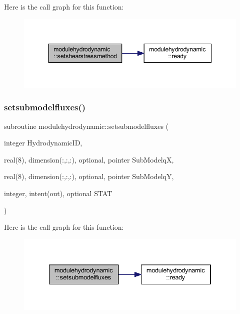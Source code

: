Here is the call graph for this function\+:\nopagebreak
\begin{figure}[H]
\begin{center}
\leavevmode
\includegraphics[width=344pt]{namespacemodulehydrodynamic_abc0b4b19014469e3102675a4dbffe103_cgraph}
\end{center}
\end{figure}
\mbox{\label{namespacemodulehydrodynamic_ab017d9a33e10a535dcc4b545900925de}} 
\subsubsection{\texorpdfstring{setsubmodelfluxes()}{setsubmodelfluxes()}}
{\footnotesize\ttfamily subroutine modulehydrodynamic\+::setsubmodelfluxes (\begin{DoxyParamCaption}\item[{integer}]{Hydrodynamic\+ID,  }\item[{real(8), dimension(\+:,\+:,\+:), optional, pointer}]{Sub\+ModelqX,  }\item[{real(8), dimension(\+:,\+:,\+:), optional, pointer}]{Sub\+ModelqY,  }\item[{integer, intent(out), optional}]{S\+T\+AT }\end{DoxyParamCaption})\hspace{0.3cm}{\ttfamily [private]}}

Here is the call graph for this function\+:\nopagebreak
\begin{figure}[H]
\begin{center}
\leavevmode
\includegraphics[width=334pt]{namespacemodulehydrodynamic_ab017d9a33e10a535dcc4b545900925de_cgraph}
\end{center}
\end{figure}
\mbox{\label{namespacemodulehydrodynamic_a9f134631e27c5fcbe9d6185409149bb5}} 
